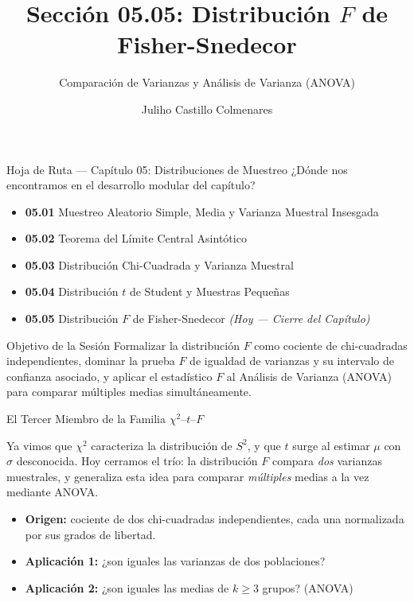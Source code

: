 \documentclass[10pt, aspectratio=169]{beamer}
\title[$F$ de Fisher-Snedecor]{Sección 05.05: Distribución $F$ de Fisher-Snedecor}
\subtitle{Comparación de Varianzas y Análisis de Varianza (ANOVA)}
\author[J. Castillo Colmenares]{Juliho Castillo Colmenares}
\institute{Tecnológico de Monterrey}
\date{\vspace{-1.2cm}}
\begin{document}
\begin{frame}[plain]
  \vspace{-0.8cm}
  \titlepage
\end{frame}

\begin{frame}{Hoja de Ruta --- Capítulo 05: Distribuciones de Muestreo}
  \footnotesize
  ¿Dónde nos encontramos en el desarrollo modular del capítulo? \pause
  \begin{itemize}\itemsep=0.08em
    \item \textbf{05.01} Muestreo Aleatorio Simple, Media y Varianza Muestral Insesgada \pause
    \item \textbf{05.02} Teorema del Límite Central Asintótico \pause
    \item \textbf{05.03} Distribución Chi-Cuadrada y Varianza Muestral \pause
    \item \textbf{05.04} Distribución $t$ de Student y Muestras Pequeñas \pause
    \item \textbf{05.05} Distribución $F$ de Fisher-Snedecor \emph{(Hoy --- Cierre del Capítulo)}
  \end{itemize}
  \vspace{-0.05cm}
  \begin{block}{Objetivo de la Sesión}
    Formalizar la distribución $F$ como cociente de chi-cuadradas independientes, dominar la prueba $F$ de igualdad de varianzas y su intervalo de confianza asociado, y aplicar el estadístico $F$ al Análisis de Varianza (ANOVA) para comparar múltiples medias simultáneamente.
  \end{block}
\end{frame}

\begin{frame}{El Tercer Miembro de la Familia $\chi^2$--$t$--$F$}
  \footnotesize
  \begin{motivacion}
    Ya vimos que $\chi^2$ caracteriza la distribución de $S^2$, y que $t$ surge al estimar $\mu$ con $\sigma$ desconocida. Hoy cerramos el trío: la distribución $F$ compara \emph{dos} varianzas muestrales, y generaliza esta idea para comparar \emph{múltiples} medias a la vez mediante ANOVA.
  \end{motivacion}

  \vspace{0.15cm}
  \pause
  \begin{itemize}\itemsep=0.1cm
    \item \textbf{Origen:} cociente de dos chi-cuadradas independientes, cada una normalizada por sus grados de libertad. \pause
    \item \textbf{Aplicación 1:} ¿son iguales las varianzas de dos poblaciones? \pause
    \item \textbf{Aplicación 2:} ¿son iguales las medias de $k\ge 3$ grupos? (ANOVA)
  \end{itemize}
\end{frame}
\end{document}
